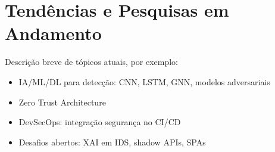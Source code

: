 {
\color{olive}

\section{
    Tendências e Pesquisas em Andamento
} \label{sec:tendencias}

Descrição breve de tópicos atuais, por exemplo:

\begin{itemize}
    \item IA/ML/DL para detecção: CNN, LSTM, GNN, modelos adversariais
    \item Zero Trust Architecture
    \item DevSecOps: integração segurança no CI/CD
    \item Desafios abertos: XAI em IDS, shadow APIs, SPAs
\end{itemize}

}